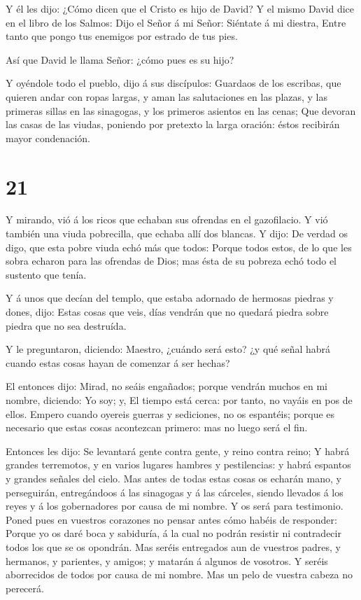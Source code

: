  Y él les dijo: ¿Cómo dicen que el Cristo es hijo de David?
 Y el mismo David dice en el libro de los Salmos: Dijo el
Señor á mi Señor: Siéntate á mi diestra,  Entre tanto que
pongo tus enemigos por estrado de tus pies.

 Así que David le llama Señor: ¿cómo pues es su hijo?

 Y oyéndole todo el pueblo, dijo á sus discípulos:
 Guardaos de los escribas, que quieren andar con ropas
largas, y aman las salutaciones en las plazas, y las primeras sillas en
las sinagogas, y los primeros asientos en las cenas;  Que
devoran las casas de las viudas, poniendo por pretexto la larga oración:
éstos recibirán mayor condenación.

\hypertarget{section-20}{%
\section{21}\label{section-20}}

 Y mirando, vió á los ricos que echaban sus ofrendas en el
gazofilacio.  Y vió también una viuda pobrecilla, que echaba
allí dos blancas.  Y dijo: De verdad os digo, que esta pobre
viuda echó más que todos:  Porque todos estos, de lo que les
sobra echaron para las ofrendas de Dios; mas ésta de su pobreza echó
todo el sustento que tenía.

 Y á unos que decían del templo, que estaba adornado de
hermosas piedras y dones, dijo:  Estas cosas que veis, días
vendrán que no quedará piedra sobre piedra que no sea destruída.

 Y le preguntaron, diciendo: Maestro, ¿cuándo será esto? ¿y
qué señal habrá cuando estas cosas hayan de comenzar á ser hechas?

 El entonces dijo: Mirad, no seáis engañados; porque vendrán
muchos en mi nombre, diciendo: Yo soy; y, El tiempo está cerca: por
tanto, no vayáis en pos de ellos.  Empero cuando oyereis
guerras y sediciones, no os espantéis; porque es necesario que estas
cosas acontezcan primero: mas no luego será el fin.

 Entonces les dijo: Se levantará gente contra gente, y
reino contra reino;  Y habrá grandes terremotos, y en
varios lugares hambres y pestilencias: y habrá espantos y grandes
señales del cielo.  Mas antes de todas estas cosas os
echarán mano, y perseguirán, entregándoos á las sinagogas y á las
cárceles, siendo llevados á los reyes y á los gobernadores por causa de
mi nombre.  Y os será para testimonio.  Poned
pues en vuestros corazones no pensar antes cómo habéis de responder:
 Porque yo os daré boca y sabiduría, á la cual no podrán
resistir ni contradecir todos los que se os opondrán.  Mas
seréis entregados aun de vuestros padres, y hermanos, y parientes, y
amigos; y matarán á algunos de vosotros.  Y seréis
aborrecidos de todos por causa de mi nombre.  Mas un pelo
de vuestra cabeza no perecerá.

